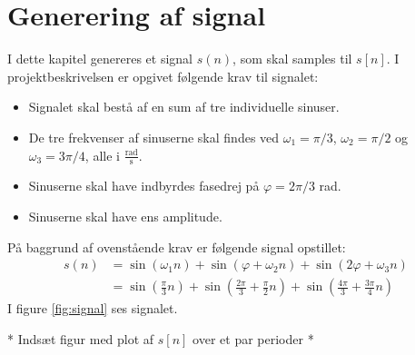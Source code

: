 \chapter{Generering af signal}
I dette kapitel genereres et signal $s(n)$, som skal samples til $s[n]$. I projektbeskrivelsen er opgivet følgende krav til signalet:
\begin{itemize}
\setlength\itemsep{0em}
\item Signalet skal bestå af en sum af tre individuelle sinuser.
\item De tre frekvenser af sinuserne skal findes ved $\omega_1=\pi/3$, $\omega_2=\pi/2$ og $\omega_3=3\pi/4$, alle i $\frac{\text{rad}}{\text{s}}$.
\item Sinuserne skal have indbyrdes fasedrej på $\varphi=2\pi/3$ rad.
\item Sinuserne skal have ens amplitude.
\end{itemize}
På baggrund af ovenstående krav er følgende signal opstillet:
\begin{align}
s(n)&=\sin\left(\omega_1n\right)+\sin\left(\varphi+\omega_2n\right)+\sin\left(2\varphi+\omega_3n\right)\\
&=\sin\left(\frac{\pi}{3}n\right)+\sin\left(\frac{2\pi}{3}+\frac{\pi}{2}n\right)+\sin\left(\frac{4\pi}{3}+\frac{3\pi}{4}n\right)\label{eq:signal}
\end{align}
I figure \ref{fig:signal} ses signalet.
\begin{center}
* Indsæt figur med plot af $s[n]$ over et par perioder *
\end{center}
